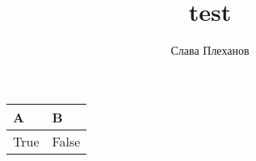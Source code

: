 \documentclass{article}
\title{test}
\author{Слава Плеханов}
\begin{document}
\begin{tabular}{ | l | l | }
\hline
A & B \\ \hline
True & False\\

\hline
\end{tabular}
\end{document}
